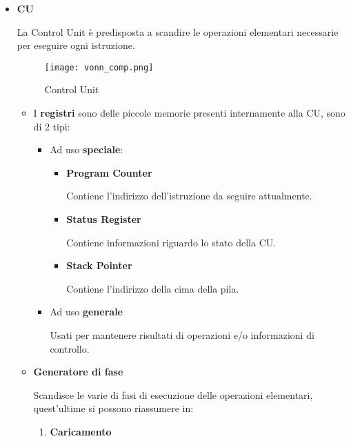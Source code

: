 \documentclass{article}
\begin{document}
\begin{itemize}
    \item \textbf{CU}

    La Control Unit è predisposta a scandire le operazioni elementari necessarie per eseguire ogni istruzione.

\begin{figure}[ht]
    \centering
    \texttt{[image: vonn\_comp.png]}
    \caption{Control Unit}
    \label{fig:von_comp}
\end{figure}

        \begin{itemize}
            \item I \textbf{registri} sono delle piccole memorie presenti internamente alla CU, sono di 2 tipi:
            \begin{itemize}
                \item Ad uso \textbf{speciale}:
                    \begin{itemize}
                        \item \textbf{Program Counter}

                            Contiene l'indirizzo dell'istruzione da seguire attualmente.

                        \item \textbf{Status Register}

                            Contiene informazioni riguardo lo stato della CU.

                        \item \textbf{Stack Pointer}

                            Contiene l'indirizzo della cima della pila.
                        
                    \end{itemize}

                    \item Ad uso \textbf{generale}

                        Usati per mantenere risultati di operazioni e/o informazioni di controllo.
                    
            \end{itemize}

            \newpage

            \item \textbf{Generatore di fase}

                Scandisce le varie di fasi di esecuzione delle operazioni elementari, quest'ultime si possono riassumere in:
                \begin{enumerate}
                    \item \textbf{Caricamento}


\end{enumerate}
\end{itemize}
\end{itemize}
\end{document}
